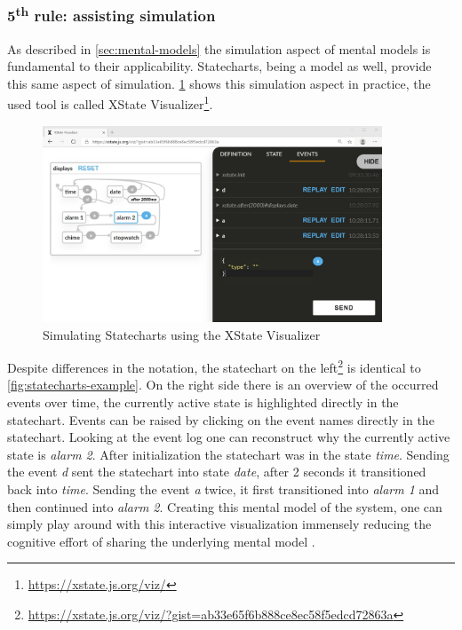 \subsubsection{5\textsuperscript{th} rule: assisting simulation}
As described in \cref{sec:mental-models} the simulation aspect of mental models is fundamental to their applicability.
Statecharts, being a model as well, provide this same aspect of simulation.
\cref{fig:xstate-simulation} shows this simulation aspect in practice, the used tool is called XState Visualizer\footnote{\url{https://xstate.js.org/viz/}}.
\begin{figure}[h]
\centering
\includegraphics[width=0.9\textwidth]{images/xstate-simulation}
\caption{Simulating Statecharts using the XState Visualizer}
\label{fig:xstate-simulation}
\end{figure}
Despite differences in the notation, the statechart on the left\footnote{\url{https://xstate.js.org/viz/?gist=ab33e65f6b888ce8ec58f5edcd72863a}} is identical to \cref{fig:statecharts-example}.
On the right side there is an overview of the occurred events over time, the currently active state is highlighted directly in the statechart.
Events can be raised by clicking on the event names directly in the statechart.
Looking at the event log one can reconstruct why the currently active state is \emph{alarm 2}.
After initialization the statechart was in the state \emph{time}. Sending the event \emph{d} sent the statechart into state \emph{date}, after 2 seconds it transitioned back into \emph{time}.
Sending the event \emph{a} twice, it first transitioned into \emph{alarm 1} and then continued into \emph{alarm 2}.
Creating this mental model of the system, one can simply play around with this interactive visualization immensely reducing the cognitive effort of sharing the underlying mental model \autocite{dutke_mentale_1994}.

